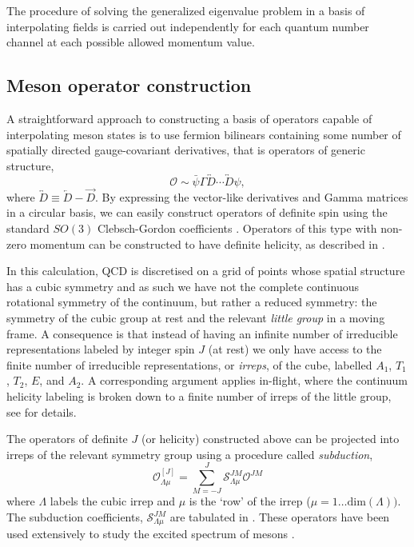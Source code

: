 \documentclass[twocolumn,amsmath,amssymb,prd,10pt,floatfix, 
superscriptaddress,nofootinbib, showpacs, preprintnumbers]{revtex4-1}
\begin{document}
The procedure of solving the generalized eigenvalue problem in a basis of interpolating fields is carried out independently for each quantum number channel at each possible allowed momentum value. 



\subsection{Meson operator construction \label{ssec::two_points_operators}}


A straightforward approach to constructing a basis of operators capable of interpolating meson states is to use fermion bilinears containing some number of spatially directed gauge-covariant derivatives, that is operators of generic structure, 
\begin{equation}
\mathcal{O} \sim \bar{\psi} \Gamma \overleftrightarrow{D} \cdots \overleftrightarrow{D} \psi,  \label{eqn::deriv_ops}
\end{equation}
where $\overleftrightarrow{D} \equiv \overleftarrow{D} - \overrightarrow{D}$. By expressing the vector-like derivatives and Gamma matrices in a circular basis, we can easily construct operators of definite spin using the standard $SO(3)$ Clebsch-Gordon coefficients \cite{Dudek:2009qf,Dudek:2010wm}.  Operators of this type with non-zero momentum can be constructed to have definite helicity, as described in \cite{Thomas:2011rh}. 

In this calculation, QCD is discretised on a grid of points whose spatial structure has a cubic symmetry and as such we have not the complete continuous rotational symmetry of the continuum, but rather a reduced symmetry: the symmetry of the cubic group at rest and the relevant \emph{little group} in a moving frame. A consequence is that instead of having an infinite number of irreducible representations labeled by integer spin $J$ (at rest) we only have access to the finite number of irreducible representations, or \emph{irreps}, of the cube, labelled $A_1$, $T_1$, $T_2$, $E$, and $A_2$.  A corresponding argument applies in-flight, where the continuum helicity labeling is broken down to a finite number of irreps of the little group, see \cite{Thomas:2011rh} for details.


The operators of definite $J$ (or helicity) constructed above can be projected into irreps of the relevant symmetry group using a procedure called \emph{subduction}, 
\begin{equation}
\mathcal{O}^{[J]}_{\Lambda \mu} = \sum_{M=-J}^J \mathcal{S}^{JM}_{\Lambda \mu} \mathcal{O}^{JM}
\end{equation}
where $\Lambda$ labels the cubic irrep and $\mu$ is the `row' of the irrep ($\mu = 1\ldots \mathrm{dim}(\Lambda))$. The subduction coefficients, $\mathcal{S}^{JM}_{\Lambda \mu}$ are tabulated in \cite{Thomas:2011rh,Dudek:2010wm}. These operators have been used extensively to study the excited spectrum of mesons \cite{Dudek:2013yja,Liu:2012ze,Dudek:2011tt,Dudek:2009qf,Dudek:2010wm,Dudek:2012xn,Dudek:2014qha}.
\end{document}
